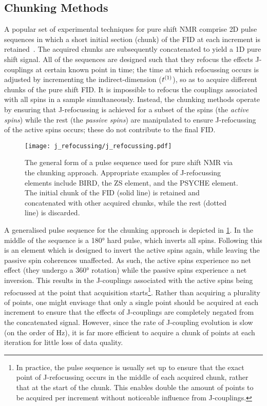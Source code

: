 \subsection{Chunking Methods}
A popular set of experimental techniques for pure shift \ac{NMR} comprise
\ac{2D} pulse sequences in which a short initial section (chunk) of the
\ac{FID} at each increment is retained~\cite{Adams2014}. The acquired chunks are
subsequently concatenated to yield a \ac{1D} pure shift signal.  All of the
sequences are designed such that they refocus the effects J-couplings at
certain known point in time;
the time at which refocussing occurs is adjusted by incrementing
the indirect-dimension ($t^{(1)}$), so as to acquire
different chunks of the pure shift \ac{FID}. It is impossible to refocus the
couplings associated with all spins in a sample simultaneously. Instead, the
chunking methods operate by ensuring that J-refocussing is achieved for a
subset of the spins (the \emph{active spins}) while the rest (the \emph{passive
spins}) are manipulated to ensure J-refocussing of the active spins occurs;
these do not contribute to the final \ac{FID}.

\begin{figure}
    \centering
    \texttt{[image: j\_refocussing/j\_refocussing.pdf]}
    \caption[
        The general form of a pulse sequence used for pure shift \acs{NMR}
        using the chunking approach.
    ]{
        The general form of a pulse sequence used for pure shift \acs{NMR}
        via the chunking approach. Appropriate examples of J-refocussing
        elements include \acs{BIRD}, the \acl{ZS} element, and the
        \acs{PSYCHE} element. The initial chunk of the \ac{FID} (solid
        line) is retained and concatenated with other acquired chunks,
        while the rest (dotted line) is discarded.
    }
    \label{fig:j-refocussing}
\end{figure}
\makeatletter
{}
\makeatother

A generalised pulse sequence for the chunking approach is depicted in
\cref{fig:j-refocussing}. In the middle of the sequence is a \ang{180} hard
pulse, which inverts all spins. Following this is an element which is designed
to invert the active spins again, while leaving the passive spin coherences
unaffected. As such, the active spins experience no net effect (they
undergo a \ang{360} rotation) while the passive spins experience a net inversion.
This results in the J-couplings associated with the active spins being
refocussed at the point that acquisition starts\footnote{
    In practice, the pulse sequence is usually set up to ensure that the exact
    point of J-refocussing occurs in the middle of each acquired chunk, rather
    that at the start of the chunk. This enables double the amount
    of points to be acquired per increment without noticeable influence from
    J-couplings.
}.
Rather than acquiring a plurality of points, one might envisage that only a
single point should be acquired at each increment to
ensure that the effects of J-couplings are completely negated from the
concatenated signal. However, since the rate of J-coupling evolution is
slow (on the order of \unit{\hertz}), it is far more efficient to acquire a
chunk of points at each iteration for little loss of data quality.

